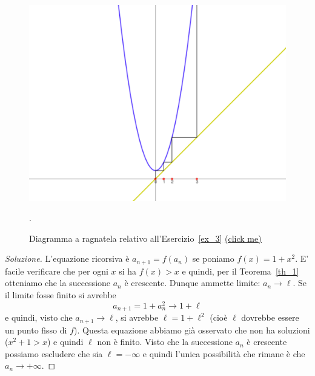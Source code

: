 \documentclass[italian,a4paper]{scrartcl}
\newcommand{\online}[1]{\href{http://paolini.github.io/recurrence/?#1}{\underline{(click
      me)}}}
\begin{document}
\begin{figure}
  \begin{center}
    \includegraphics[width=\textwidth]{fig_ex_3.png}
  \end{center}
  \caption{Diagramma a ragnatela relativo
    all'Esercizio~\ref{ex_3} \online{expr=1\%2Bx*x&x=1&scale=20&yoff=9&x=0}}.
  \label{fig_ex_3}
\end{figure}

\begin{proof}[Soluzione]
  L'equazione ricorsiva è $a_{n+1}=f(a_n)$ se poniamo $f(x) = 1+x^2$.
  E' facile verificare che per ogni $x$ si ha $f(x) > x$ e quindi, per
  il Teorema~\ref{th_1} otteniamo che la successione $a_n$ è
  crescente. Dunque ammette limite: $a_n \to \ell$. Se il limite fosse
  finito si avrebbe
  \[
  a_{n+1} = 1 + a_n^2 \to 1 + \ell
  \]
  e quindi, visto che $a_{n+1}\to \ell$, si avrebbe $\ell = 1 +
  \ell^2$ (cioè $\ell$ dovrebbe essere un punto fisso di $f$). Questa
  equazione abbiamo già osservato che non ha soluzioni ($x^2 + 1 > x$)
  e quindi $\ell$ non è finito. Visto che la successione $a_n$ è
  crescente possiamo escludere che sia $\ell=-\infty$ e quindi l'unica
  possibilità che rimane è che $a_n \to +\infty$.
\end{proof}
\end{document}
